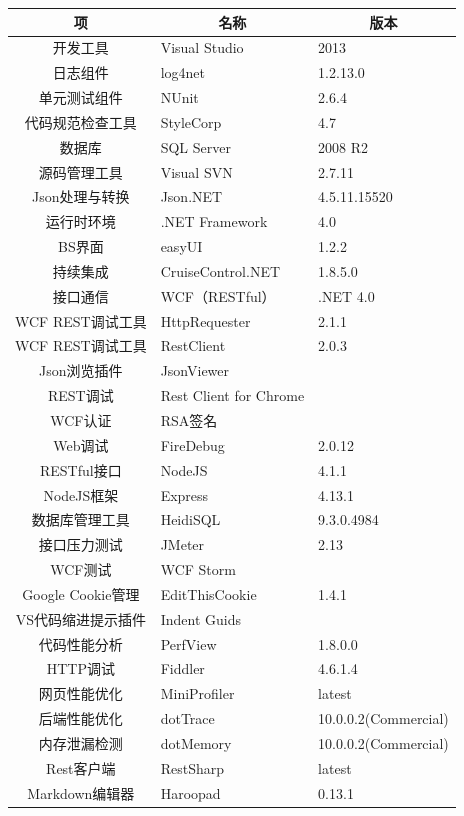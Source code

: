 \documentclass{book}
\begin{document}
\begin{tabular}{c|l|l}
	\multirow{1}{*}{项}			
	& \multicolumn{1}{c}{名称}
	& \multicolumn{1}{|c}{版本}\\
	\hline
	开发工具 & Visual Studio & 2013\\
	日志组件 & log4net & 1.2.13.0\\	
	单元测试组件 & NUnit & 2.6.4\\
	代码规范检查工具 & StyleCorp & 4.7\\	
	数据库 & SQL Server & 2008 R2\\
	源码管理工具 & Visual SVN & 2.7.11\\
	Json处理与转换 & Json.NET & 4.5.11.15520\\
	运行时环境 & .NET Framework & 4.0\\
	BS界面 & easyUI & 1.2.2\\
	持续集成 & CruiseControl.NET & 1.8.5.0\\
	接口通信 & WCF（RESTful） & .NET 4.0\\
	WCF REST调试工具 & HttpRequester & 2.1.1 \\
	WCF REST调试工具 & RestClient & 2.0.3 \\
	Json浏览插件 & JsonViewer & \\
	REST调试 & Rest Client for Chrome & \\
	WCF认证 & RSA签名 & \\
	Web调试 & FireDebug & 2.0.12\\
	RESTful接口 & NodeJS & 4.1.1\\
	NodeJS框架 & Express & 4.13.1\\
	数据库管理工具 & HeidiSQL & 9.3.0.4984\\
	接口压力测试 & JMeter & 2.13\\
	WCF测试 & WCF Storm & \\
	Google Cookie管理 & EditThisCookie & 1.4.1 \\
	VS代码缩进提示插件 & Indent Guids & \\
	代码性能分析 & PerfView & 1.8.0.0  \\ 
	HTTP调试 &  Fiddler & 4.6.1.4\\		
    网页性能优化 & MiniProfiler & latest\\
    后端性能优化 & dotTrace & 10.0.0.2(Commercial)\\
    内存泄漏检测 & dotMemory & 10.0.0.2(Commercial)\\
    Rest客户端 & RestSharp & latest\\
    Markdown编辑器 & Haroopad & 0.13.1\\		
    \end{tabular}
\end{document}
